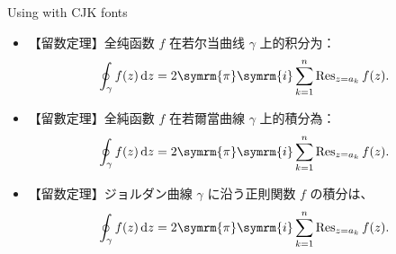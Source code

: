 \documentclass[aspectratio=169]{beamer}
\def\ii{\symrm{i}}
\def\pp{\symrm{\pi}}
\begin{document}
\begin{frame}[noframenumbering]{Using with CJK fonts}
\begin{itemize}
  \item {\fontzhhans 【留数定理】全纯函数 $f$ 在若尔当曲线 $\gamma$ 上的积分为：}
    \[
      \oint_\gamma f(z) \dd{z}
      = 2\pp\ii \sum_{k=1}^n \Res_{z=a_k} f(z).
    \]
  \item {\fontzhhant 【留數定理】全純函數 $f$ 在若爾當曲線 $\gamma$ 上的積分為：}
    \[
      \oint_\gamma f(z) \dd{z}
      = 2\pp\ii \sum_{k=1}^n \Res_{z=a_k} f(z).
    \]
  \item {\fontja 【留数定理】ジョルダン曲線 $\gamma$ に沿う正則関数 $f$ の積分は、}
    \[
      \oint_\gamma f(z) \dd{z}
      = 2\pp\ii \sum_{k=1}^n \Res_{z=a_k} f(z).
    \]
\end{itemize}
\end{frame}
\end{document}
